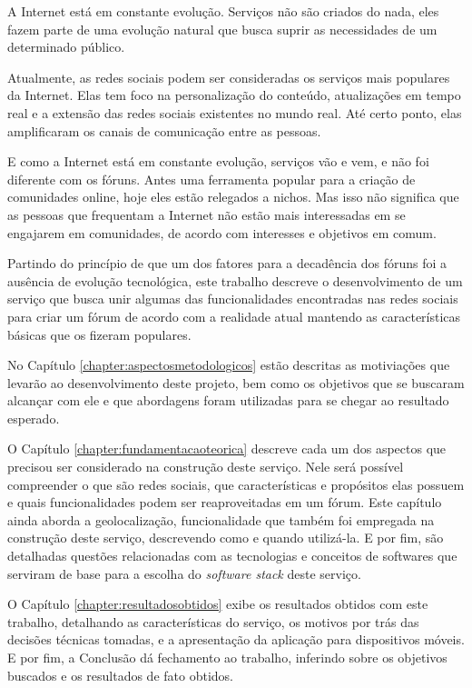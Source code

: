 \documentclass[diss]{template/setrem}
\begin{document}
\begin{introduction}
A Internet está em constante evolução. Serviços não são criados do nada, eles fazem parte de uma evolução natural que busca suprir as necessidades de um determinado público.

Atualmente, as redes sociais podem ser consideradas os serviços mais populares da Internet. Elas tem foco na personalização do conteúdo, atualizações em tempo real e a extensão das redes sociais existentes no mundo real. Até certo ponto, elas amplificaram os canais de comunicação entre as pessoas.

E como a Internet está em constante evolução, serviços vão e vem, e não foi diferente com os fóruns. Antes uma ferramenta popular para a criação de comunidades online, hoje eles estão relegados a nichos. Mas isso não significa que as pessoas que frequentam a Internet não estão mais interessadas em se engajarem em comunidades, de acordo com interesses e objetivos em comum.

Partindo do princípio de que um dos fatores para a decadência dos fóruns foi a ausência de evolução tecnológica, este trabalho descreve o desenvolvimento de um serviço que busca unir algumas das funcionalidades encontradas nas redes sociais para criar um fórum de acordo com a realidade atual mantendo as características básicas que os fizeram populares.

No Capítulo \ref{chapter:aspectosmetodologicos} estão descritas as motiviações que levarão ao desenvolvimento deste projeto, bem como os objetivos que se buscaram alcançar com ele e que abordagens foram utilizadas para se chegar ao resultado esperado.

O Capítulo \ref{chapter:fundamentacaoteorica} descreve cada um dos aspectos que precisou ser considerado na construção deste serviço. Nele será possível compreender o que são redes sociais, que características e propósitos elas possuem e quais funcionalidades podem ser reaproveitadas em um fórum. Este capítulo ainda aborda a geolocalização, funcionalidade que também foi empregada na construção deste serviço, descrevendo como e quando utilizá-la. E por fim, são detalhadas questões relacionadas com as tecnologias e conceitos de softwares que serviram de base para a escolha do \emph{software stack} deste serviço.

O Capítulo \ref{chapter:resultadosobtidos} exibe os resultados obtidos com este trabalho, detalhando as características do serviço, os motivos por trás das decisões técnicas tomadas, e a apresentação da aplicação para dispositivos móveis. E por fim, a Conclusão dá fechamento ao trabalho, inferindo sobre os objetivos buscados e os resultados de fato obtidos.
\end{introduction}
\end{document}
